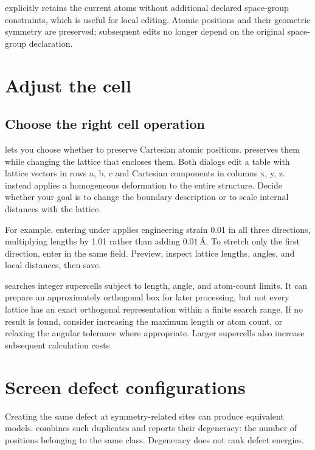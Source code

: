  explicitly retains the current atoms without additional declared space-group constraints, which is useful for local editing. Atomic positions and their geometric symmetry are preserved; subsequent edits no longer depend on the original space-group declaration.

\section{Adjust the cell}

\subsection{Choose the right cell operation}

 lets you choose whether to preserve Cartesian atomic positions.  preserves them while changing the lattice that encloses them. Both dialogs edit a table with lattice vectors in rows a, b, c and Cartesian components in columns x, y, z.  instead applies a homogeneous deformation to the entire structure. Decide whether your goal is to change the boundary description or to scale internal distances with the lattice.

For example, entering  under  applies engineering strain 0.01 in all three directions, multiplying lengths by 1.01 rather than adding $0.01\,\text{\AA}$. To stretch only the first direction, enter  in the same field. Preview, inspect lattice lengths, angles, and local distances, then save.

 searches integer supercells subject to length, angle, and atom-count limits. It can prepare an approximately orthogonal box for later processing, but not every lattice has an exact orthogonal representation within a finite search range. If no result is found, consider increasing the maximum length or atom count, or relaxing the angular tolerance where appropriate. Larger supercells also increase subsequent calculation costs.

\section{Screen defect configurations}

Creating the same defect at symmetry-related sites can produce equivalent models.  combines such duplicates and reports their degeneracy: the number of positions belonging to the same class. Degeneracy does not rank defect energies.

